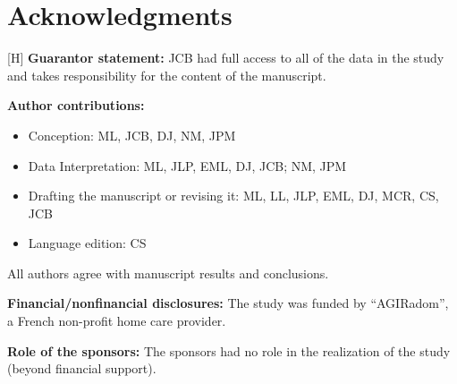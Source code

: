 \section{Acknowledgments}[H]
\textbf{}
\hspace{\par}
\textbf{Guarantor statement:} JCB had full access to all of the data in the study and takes responsibility for the content of the manuscript.

\medbreak

\textbf{Author contributions:}
\begin{itemize}
    \item Conception: ML, JCB, DJ, NM, JPM

    \item Data Interpretation: ML, JLP, EML, DJ, JCB; NM, JPM 

    \item Drafting the manuscript or revising it: ML, LL, JLP, EML, DJ, MCR, CS, JCB

    \item Language edition: CS
\end{itemize}
All authors agree with manuscript results and conclusions. 

\medbreak

\textbf{Financial/nonfinancial disclosures:} The study was funded by “AGIRadom”, a French non-profit home care provider.

\medbreak

\textbf{Role of the sponsors:} The sponsors had no role in the realization of the study (beyond financial support). 